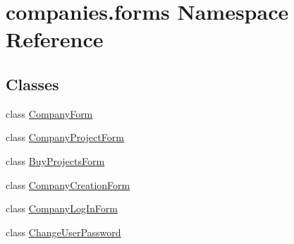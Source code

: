 \hypertarget{namespacecompanies_1_1forms}{\section{companies.\-forms Namespace Reference}
\label{namespacecompanies_1_1forms}
}
\subsection*{Classes}
\begin{DoxyCompactItemize}
\item 
class \hyperlink{classcompanies_1_1forms_1_1_company_form}{Company\-Form}
\item 
class \hyperlink{classcompanies_1_1forms_1_1_company_project_form}{Company\-Project\-Form}
\item 
class \hyperlink{classcompanies_1_1forms_1_1_buy_projects_form}{Buy\-Projects\-Form}
\item 
class \hyperlink{classcompanies_1_1forms_1_1_company_creation_form}{Company\-Creation\-Form}
\item 
class \hyperlink{classcompanies_1_1forms_1_1_company_log_in_form}{Company\-Log\-In\-Form}
\item 
class \hyperlink{classcompanies_1_1forms_1_1_change_user_password}{Change\-User\-Password}
\end{DoxyCompactItemize}
